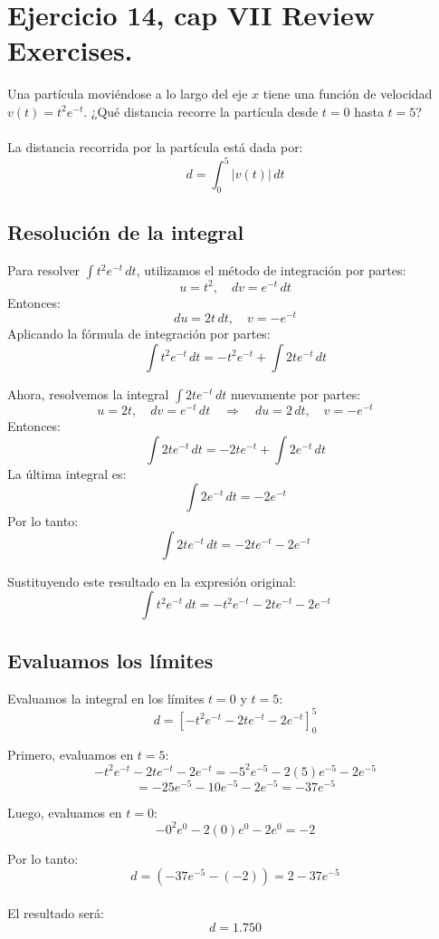 \documentclass[11pt,letterpaper]{article}
\begin{document}
\section{Ejercicio 14, cap VII Review Exercises.}
Una partícula moviéndose a lo largo del eje $x$ tiene una función de velocidad $v(t)=t^2e^{-t}$. ¿Qué distancia recorre la partícula desde $t=0$ hasta $t=5$?
\\
\\La distancia recorrida por la partícula está dada por:
\[
d = \int_0^5 |v(t)| \, dt
\]

\subsection*{Resolución de la integral}
Para resolver \( \int t^2 e^{-t} \, dt \), utilizamos el método de integración por partes:
\[
u = t^2, \quad dv = e^{-t} \, dt
\]
Entonces:
\[
du = 2t \, dt, \quad v = -e^{-t}
\]
Aplicando la fórmula de integración por partes:
\[
\int t^2 e^{-t} \, dt = -t^2 e^{-t} + \int 2t e^{-t} \, dt
\]

Ahora, resolvemos la integral \( \int 2t e^{-t} \, dt \) nuevamente por partes:
\[
u = 2t, \quad dv = e^{-t} \, dt \quad \Rightarrow \quad du = 2 \, dt, \quad v = -e^{-t}
\]
Entonces:
\[
\int 2t e^{-t} \, dt = -2t e^{-t} + \int 2e^{-t} \, dt
\]
La última integral es:
\[
\int 2e^{-t} \, dt = -2e^{-t}
\]
Por lo tanto:
\[
\int 2t e^{-t} \, dt = -2t e^{-t} - 2e^{-t}
\]

Sustituyendo este resultado en la expresión original:
\[
\int t^2 e^{-t} \, dt = -t^2 e^{-t} - 2t e^{-t} - 2e^{-t}
\]

\subsection*{Evaluamos los límites}
Evaluamos la integral en los límites \( t = 0 \) y \( t = 5 \):
\[
d = \left[ -t^2 e^{-t} - 2t e^{-t} - 2e^{-t} \right]_0^5
\]

Primero, evaluamos en \( t = 5 \):
\[
-t^2 e^{-t} - 2t e^{-t} - 2e^{-t} = -5^2 e^{-5} - 2(5)e^{-5} - 2e^{-5}
\]
\[
= -25e^{-5} - 10e^{-5} - 2e^{-5} = -37e^{-5}
\]

Luego, evaluamos en \( t = 0 \):
\[
-0^2 e^{0} - 2(0)e^{0} - 2e^{0} = -2
\]

Por lo tanto:
\[
d = \left(-37e^{-5} - (-2)\right) = 2 - 37e^{-5}
\]
\\El resultado será: 
\begin{equation*}
  d = 1.750
\end{equation*}
\end{document}
